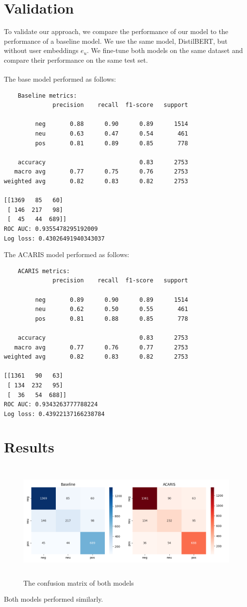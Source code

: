 \documentclass{article}
\begin{document}
\section{Validation}
To validate our approach, we compare the performance of our model to the performance of a baseline model. We use the same model, DistilBERT, but without user embeddings $e_u$. We fine-tune both models on the same dataset and compare their performance on the same test set.\\\\
The base model performed as follows:
\begin{lstlisting}
	Baseline metrics:
              precision    recall  f1-score   support

         neg       0.88      0.90      0.89      1514
         neu       0.63      0.47      0.54       461
         pos       0.81      0.89      0.85       778

    accuracy                           0.83      2753
   macro avg       0.77      0.75      0.76      2753
weighted avg       0.82      0.83      0.82      2753

[[1369   85   60]
 [ 146  217   98]
 [  45   44  689]]
ROC AUC: 0.9355478295192009
Log loss: 0.43026491940343037
\end{lstlisting}
The ACARIS model performed as follows:
\begin{lstlisting}
	ACARIS metrics:
              precision    recall  f1-score   support

         neg       0.89      0.90      0.89      1514
         neu       0.62      0.50      0.55       461
         pos       0.81      0.88      0.85       778

    accuracy                           0.83      2753
   macro avg       0.77      0.76      0.77      2753
weighted avg       0.82      0.83      0.82      2753

[[1361   90   63]
 [ 134  232   95]
 [  36   54  688]]
ROC AUC: 0.9343263777788224
Log loss: 0.43922137166238784
\end{lstlisting}
\break
\section{Results}
\begin{figure}[h!]
	\centering
	\includegraphics[width=\textwidth,height=6cm]{images/confusion_matrix.png}
	\caption{The confusion matrix of both models}
	\label{fig:Conf}
\end{figure}
Both models performed similarly.
\end{document}
